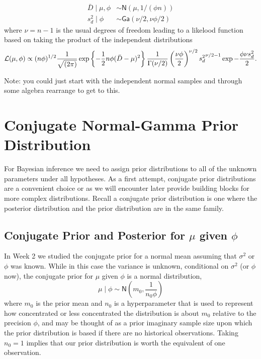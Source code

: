 \documentclass[11pt]{article}
\def\No{\textsf{N}}
\def\Ga{\textsf{Ga}}
\begin{document}
\begin{align}
 \bar{D} \mid \mu, \phi & \sim \No\left(\mu,  1/(\phi n)\right) \\
 s^2_d \mid \phi & \sim  \Ga(\nu/2,  \nu \phi/2 )
\end{align}
where $\nu = n-1 $ is the usual degrees of freedom leading to a likelood function based on taking the product of the independent distributions 
$$
{\cal{L}}(\mu, \phi) \propto (n\phi)^{1/2} \frac{1}{\sqrt{(2 \pi)}} 
\exp\left\{- \frac 1 2  n \phi (\bar{D} - \mu)^2 \right\}
\frac{1 }{\Gamma(\nu/2)} \left(\frac{\nu \phi}{2}\right)^{\nu/2} {s^2_d}^{\nu/2 - 1} \exp{- \frac{\phi \nu s^2_d}{2}}.
$$

Note:  you could just start with the independent normal samples and through some algebra rearrange to get to this.

\section*{Conjugate Normal-Gamma Prior Distribution}


For Bayesian inference we need to assign prior distributions to all of the unknown parameters under all hypotheses. As a first attempt, conjugate prior distributions are a convenient choice or as we will encounter later provide building blocks for more complex distributions. Recall a conjugate prior distribution is one where the posterior distribution and the prior distribution are in the same family. 

\subsection*{Conjugate Prior and Posterior for $\mu$ given $\phi$}

In Week 2 we studied the conjugate prior for a normal mean assuming that $\sigma^2$ or $\phi$ was known.   While in this case the variance is unknown, 
conditional on $\sigma^2$ (or $\phi$ now), the conjugate prior for $\mu$ given $\phi$ is a normal distribution,  
$$ \mu \mid \phi \sim \No \left(m_0, \frac{1}{n_0 \phi} \right)
$$
where $m_0$ is the prior mean and $n_0$ is a hyperparameter that is used to represent
how concentrated or less concentrated the distribution is about $m_0$ relative to the precision $\phi$, and may be
thought of as a prior imaginary sample size upon which the prior distribution is 
based if there are no historical observations. Taking $n_0 = 1$ implies that our prior distribution is worth the 
equivalent of one observation.  
\end{document}
